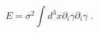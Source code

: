 \begin{equation}
E=\sigma ^{2}\int d^{3}x\partial _{i}\gamma \partial _{i}\gamma \;.
\label{eg}
\end{equation}

